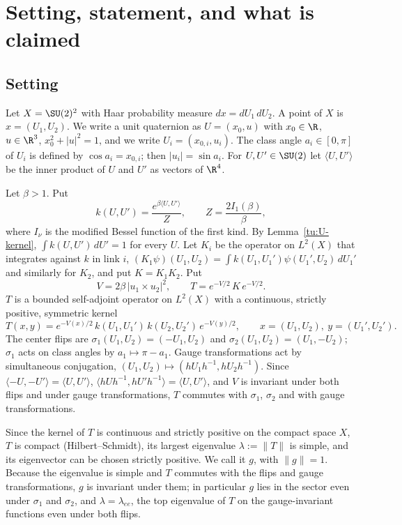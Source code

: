 
\section{Setting, statement, and what is claimed}\label{tu:U-sec-intro}

\subsection{Setting}
Let $X=\SU(2)^2$ with Haar probability measure $dx=dU_1\,dU_2$. A point of $X$ is $x=(U_1,U_2)$.
We write a unit quaternion as $U=(x_0,u)$ with $x_0\in\R$, $u\in\R^3$, $x_0^2+|u|^2=1$, and we write
$U_i=(x_{0,i},u_i)$. The class angle $a_i\in[0,\pi]$ of $U_i$ is defined by $\cos a_i=x_{0,i}$; then
$|u_i|=\sin a_i$. For $U,U'\in\SU(2)$ let $\langle U,U'\rangle$ be the inner product of $U$ and $U'$ as
vectors of $\R^4$.

Let $\beta>1$. Put
\[
k(U,U')=\frac{e^{\beta\langle U,U'\rangle}}{Z},\qquad Z=\frac{2I_1(\beta)}{\beta},
\]
where $I_\nu$ is the modified Bessel function of the first kind. By Lemma~\ref{tu:U-kernel},
$\int k(U,U')\,dU'=1$ for every $U$. Let $K_i$ be the operator on $L^2(X)$ that integrates against $k$
in link $i$, $(K_1\psi)(U_1,U_2)=\int k(U_1,U_1')\psi(U_1',U_2)\,dU_1'$ and similarly for $K_2$, and put
$K=K_1K_2$. Put
\[
V=2\beta\,|u_1\times u_2|^2,\qquad T=e^{-V/2}\,K\,e^{-V/2}.
\]
$T$ is a bounded self-adjoint operator on $L^2(X)$ with a continuous, strictly positive, symmetric
kernel
\[
T(x,y)=e^{-V(x)/2}\,k(U_1,U_1')\,k(U_2,U_2')\,e^{-V(y)/2},\qquad x=(U_1,U_2),\ y=(U_1',U_2').
\]
The center flips are $\sigma_1(U_1,U_2)=(-U_1,U_2)$ and $\sigma_2(U_1,U_2)=(U_1,-U_2)$; $\sigma_1$ acts on
class angles by $a_1\mapsto\pi-a_1$. Gauge transformations act by simultaneous conjugation,
$(U_1,U_2)\mapsto(hU_1h^{-1},hU_2h^{-1})$. Since $\langle -U,-U'\rangle=\langle U,U'\rangle$,
$\langle hUh^{-1},hU'h^{-1}\rangle=\langle U,U'\rangle$, and $V$ is invariant under both flips and under
gauge transformations, $T$ commutes with $\sigma_1$, $\sigma_2$ and with gauge transformations.

Since the kernel of $T$ is continuous and strictly positive on the compact space $X$, $T$ is compact
(Hilbert--Schmidt), its largest eigenvalue $\lambda:=\|T\|$ is simple, and its eigenvector can be chosen
strictly positive. We call it $g$, with $\|g\|=1$. Because the eigenvalue is simple and $T$ commutes with
the flips and gauge transformations, $g$ is invariant under them; in particular $g$ lies in the sector
even under $\sigma_1$ and $\sigma_2$, and $\lambda=\lambda_{ee}$, the top eigenvalue of $T$ on the
gauge-invariant functions even under both flips.

